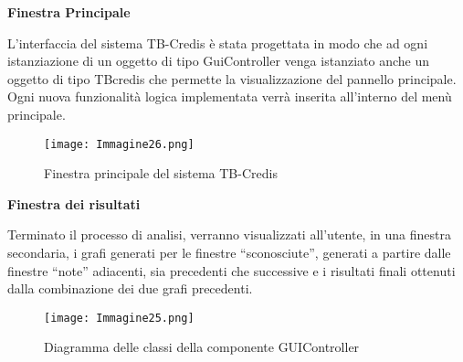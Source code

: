 \textbf{Finestra Principale}

L'interfaccia del sistema TB-Credis è stata progettata in modo che ad ogni istanziazione di un oggetto di tipo GuiController venga istanziato anche un oggetto di tipo TBcredis che permette la visualizzazione del pannello principale.
Ogni nuova funzionalità logica implementata verrà inserita all'interno del menù principale.
 \begin{figure}[H]
	\centering
	\texttt{[image: Immagine26.png]}
	\caption{Finestra principale del sistema TB-Credis}
	\label{}
\end{figure}

\textbf{Finestra dei risultati}

Terminato il processo di analisi, verranno visualizzati all'utente, in una finestra secondaria, i grafi generati per le finestre ``sconosciute'', generati a partire dalle finestre ``note'' adiacenti, sia precedenti che successive e i risultati finali ottenuti dalla combinazione dei due grafi precedenti.

 \begin{figure}[H]
	\centering
	\texttt{[image: Immagine25.png]}
	\caption{Diagramma delle classi della componente GUIController}
	\label{}
\end{figure}




